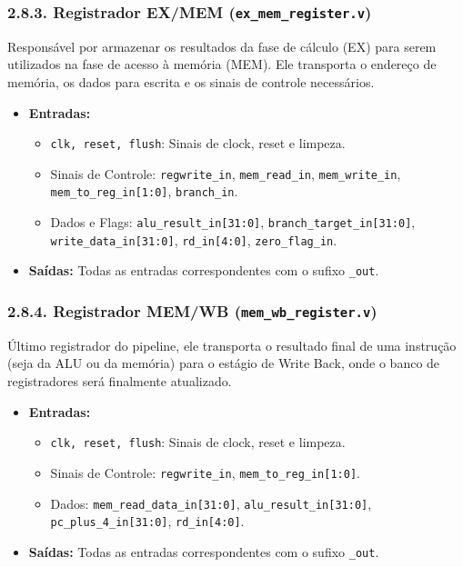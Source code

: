 \documentclass[12pt, a4paper]{article}
\begin{document}
\subsubsection*{2.8.3. Registrador EX/MEM (\texttt{ex\_mem\_register.v})}
Responsável por armazenar os resultados da fase de cálculo (EX) para serem utilizados na fase de acesso à memória (MEM). Ele transporta o endereço de memória, os dados para escrita e os sinais de controle necessários.

\begin{itemize}
    \item \textbf{Entradas:}
    \begin{itemize}
        \item \texttt{clk, reset, flush}: Sinais de clock, reset e limpeza.
        \item Sinais de Controle: \texttt{regwrite\_in}, \texttt{mem\_read\_in}, \texttt{mem\_write\_in}, \texttt{mem\_to\_reg\_in[1:0]}, \texttt{branch\_in}.
        \item Dados e Flags: \texttt{alu\_result\_in[31:0]}, \texttt{branch\_target\_in[31:0]}, \texttt{write\_data\_in[31:0]}, \texttt{rd\_in[4:0]}, \texttt{zero\_flag\_in}.
    \end{itemize}
    \item \textbf{Saídas:} Todas as entradas correspondentes com o sufixo \texttt{\_out}.
\end{itemize}

\subsubsection*{2.8.4. Registrador MEM/WB (\texttt{mem\_wb\_register.v})}
Último registrador do pipeline, ele transporta o resultado final de uma instrução (seja da ALU ou da memória) para o estágio de Write Back, onde o banco de registradores será finalmente atualizado.

\begin{itemize}
    \item \textbf{Entradas:}
    \begin{itemize}
        \item \texttt{clk, reset, flush}: Sinais de clock, reset e limpeza.
        \item Sinais de Controle: \texttt{regwrite\_in}, \texttt{mem\_to\_reg\_in[1:0]}.
        \item Dados: \texttt{mem\_read\_data\_in[31:0]}, \texttt{alu\_result\_in[31:0]}, \texttt{pc\_plus\_4\_in[31:0]}, \texttt{rd\_in[4:0]}.
    \end{itemize}
    \item \textbf{Saídas:} Todas as entradas correspondentes com o sufixo \texttt{\_out}.
\end{itemize}
\end{document}
